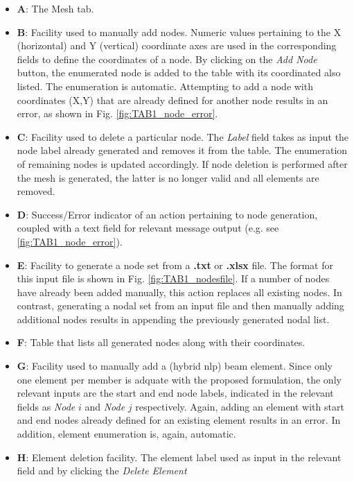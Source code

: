 \begin{itemize}
	\item \textbf{A}: The Mesh tab.
	\item \textbf{B}: Facility used to manually add nodes. Numeric values 
	pertaining to the X (horizontal) and Y (vertical) coordinate axes are used 
	in the corresponding fields to define the coordinates of a node. By 
	clicking on the \textit{Add Node} button, the enumerated node is added to 
	the table with its coordinated also listed. The enumeration is automatic. 
	Attempting to add a node with coordinates (X,Y) that are already defined 
	for another node results in an error, as shown in Fig. 
	\ref{fig:TAB1_node_error}.
	\item \textbf{C}: Facility used to delete a particular node. The 
	\textit{Label} field takes as input the node label already generated and 
	removes it from the table. The enumeration of remaining nodes is updated 
	accordingly. If node deletion is performed after the mesh is generated, the 
	latter is no longer valid and all elements are removed.
	\item \textbf{D}: Success/Error indicator of an action pertaining to node 
	generation, coupled with a text field for relevant message output (e.g. see 
	\ref{fig:TAB1_node_error}).
	\item \textbf{E}: Facility to generate a node set from a \textbf{.txt} or 
	\textbf{.xlsx} file. The format for this input file is shown in Fig. 
	\ref{fig:TAB1_nodesfile}. If a number of nodes have already been added 
	manually, this action replaces all existing nodes. In contrast, generating 
	a nodal set from an input file and then manually adding additional nodes 
	results in appending the previously generated nodal list.
	\item \textbf{F}: Table that lists all generated nodes along with their 
	coordinates.
	\item \textbf{G}: Facility used to manually add a (hybrid \acrshort{nlp}) 
	beam element. Since only one element per member is adquate with the 
	proposed formulation, the only relevant inputs are the start and end node 
	labels, indicated in the relevant fields as \textit{Node} $i$ and 
	\textit{Node} $j$ respectively. Again, adding an element with start and end 
	nodes already defined for an existing element results in an error. In 
	addition, element enumeration is, again, automatic.
	\item \textbf{H}: Element deletion facility. The element label used as 
	input in the relevant field and by clicking the \textit{Delete Element} 

\end{itemize}
